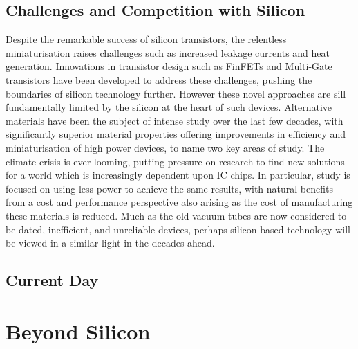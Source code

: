 
\subsection{Challenges and Competition with Silicon} 
Despite the remarkable success of silicon transistors, the relentless miniaturisation raises challenges such as increased leakage currents and heat generation. Innovations in transistor design such as FinFETs and Multi-Gate transistors have been developed to address these challenges, pushing the boundaries of silicon technology further. However these novel approaches are sill fundamentally limited by the silicon at the heart of such devices. Alternative materials have been the subject of intense study over the last few decades, with significantly superior material properties offering improvements in efficiency and miniaturisation of high power devices, to name two key areas of study. The climate crisis is ever looming, putting pressure on research to find new solutions for a world which is increasingly dependent upon IC chips. In particular, study is focused on using less power to achieve the same results, with natural benefits from a cost and performance perspective also arising as the cost of manufacturing these materials is reduced. Much as the old vacuum tubes are now considered to be dated, inefficient, and unreliable devices, perhaps silicon based technology will be viewed in a similar light in the decades ahead.

\subsection{Current Day}

\section{Beyond Silicon}
